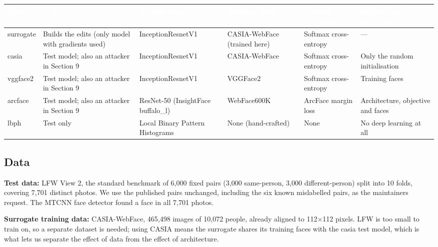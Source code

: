 \documentclass[10pt,a4paper]{article}
\begin{document}
\begin{center}\footnotesize
\begin{tabular}{>{\raggedright\arraybackslash}p{1.49cm}>{\raggedright\arraybackslash}p{2.99cm}>{\raggedright\arraybackslash}p{2.79cm}>{\raggedright\arraybackslash}p{2.59cm}>{\raggedright\arraybackslash}p{2.39cm}>{\raggedright\arraybackslash}p{3.19cm}}
\toprule
\rowcolor{navy}\textcolor{white}{\textbf{Model}} & \textcolor{white}{\textbf{Role}} & \textcolor{white}{\textbf{Architecture}} & \textcolor{white}{\textbf{Training faces}} & \textcolor{white}{\textbf{Training objective}} & \textcolor{white}{\textbf{Differs from surrogate in}} \\
\midrule
surrogate & Builds the edits (only model with gradients used) & InceptionResnetV1 & CASIA-WebFace (trained here) & Softmax cross-entropy & --- \\
\rowcolor{zebra}casia & Test model; also an attacker in Section 9 & InceptionResnetV1 & CASIA-WebFace & Softmax cross-entropy & Only the random initialisation \\
vggface2 & Test model; also an attacker in Section 9 & InceptionResnetV1 & VGGFace2 & Softmax cross-entropy & Training faces \\
\rowcolor{zebra}arcface & Test model; also an attacker in Section 9 & ResNet-50 (InsightFace buffalo\_l) & WebFace600K & ArcFace margin loss & Architecture, objective and faces \\
lbph & Test only & Local Binary Pattern Histograms & None (hand-crafted) & None & No deep learning at all \\
\bottomrule
\end{tabular}
\end{center}

\subsection{Data}

\textbf{Test data:} LFW View 2, the standard benchmark of 6,000 fixed pairs (3,000 same-person, 3,000 different-person) split into 10 folds, covering 7,701 distinct photos. We use the published pairs unchanged, including the six known mislabelled pairs, as the maintainers request. The MTCNN face detector found a face in all 7,701 photos.


\textbf{Surrogate training data:} CASIA-WebFace, 465,498 images of 10,072 people, already aligned to 112$\times$112 pixels. LFW is too small to train on, so a separate dataset is needed; using CASIA means the surrogate shares its training faces with the casia test model, which is what lets us separate the effect of data from the effect of architecture.
\end{document}
